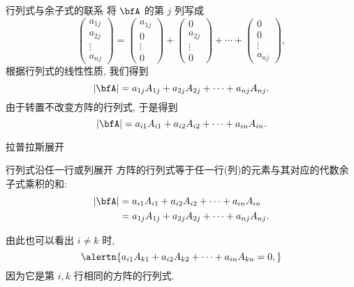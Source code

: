 \begin{frame}{行列式与余子式的联系}
	\onslide<+->
	将 $\bfA$ 的第 $j$ 列写成
	\[\begin{pmatrix}
		a_{1j}\\a_{2j}\\\vdots\\a_{nj}
	\end{pmatrix}
	=\begin{pmatrix}
		a_{1j}\\0\\\vdots\\0
	\end{pmatrix}
	+\begin{pmatrix}
		0\\a_{2j}\\\vdots\\0
	\end{pmatrix}+\cdots+\begin{pmatrix}
		0\\0\\\vdots\\a_{nj}
	\end{pmatrix},\]
	\onslide<+->
	根据行列式的线性性质, 我们得到
	\[|\bfA|=a_{1j}A_{1j}+a_{2j}A_{2j}+\cdots+a_{nj}A_{nj}.\]
	\onslide<+->
	由于转置不改变方阵的行列式, 于是得到
	\[|\bfA|=a_{i1}A_{i1}+a_{i2}A_{i2}+\cdots+a_{in}A_{in}.\]
\end{frame}


\begin{frame}{拉普拉斯展开}
	\onslide<+->
	\begin{second}{行列式沿任一行或列展开}
		方阵的行列式等于任一行(列)的元素与其对应的代数余子式乘积的和:
		\begin{align*}
			|\bfA|&=a_{i1}A_{i1}+a_{i2}A_{i2}+\cdots+a_{in}A_{in}\\
			&=a_{1j}A_{1j}+a_{2j}A_{2j}+\cdots+a_{nj}A_{nj}.
		\end{align*}
	\end{second}
	\onslide<+->
	由此也可以看出 \alert{$i\neq k$ 时,}
	\[\alertn{a_{i1}A_{k1}+a_{i2}A_{k2}+\cdots+a_{in}A_{kn}=0,}\]
	\onslide<+->
	因为它是第 $i,k$ 行相同的方阵的行列式.
\end{frame}


